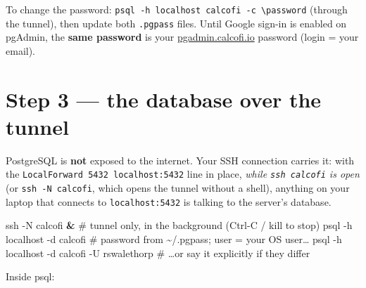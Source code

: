 \documentclass[
  letterpaper,
  DIV=11,
  numbers=noendperiod]{scrreprt}
\newenvironment{Shaded}{\begin{snugshade}}{\end{snugshade}}
\newcommand{\AttributeTok}[1]{\textcolor[rgb]{0.40,0.45,0.13}{#1}}
\newcommand{\CommentTok}[1]{\textcolor[rgb]{0.37,0.37,0.37}{#1}}
\newcommand{\DecValTok}[1]{\textcolor[rgb]{0.68,0.00,0.00}{#1}}
\newcommand{\ExtensionTok}[1]{\textcolor[rgb]{0.00,0.23,0.31}{#1}}
\newcommand{\FunctionTok}[1]{\textcolor[rgb]{0.28,0.35,0.67}{#1}}
\newcommand{\KeywordTok}[1]{\textcolor[rgb]{0.00,0.23,0.31}{\textbf{#1}}}
\newcommand{\NormalTok}[1]{\textcolor[rgb]{0.00,0.23,0.31}{#1}}
\newcommand{\OperatorTok}[1]{\textcolor[rgb]{0.37,0.37,0.37}{#1}}
\begin{document}
To change the password:
\texttt{psql\ -h\ localhost\ calcofi\ -c\ \textquotesingle{}\textbackslash{}password\textquotesingle{}}
(through the tunnel), then update both \texttt{.pgpass} files. Until
Google sign-in is enabled on pgAdmin, the \textbf{same password} is your
\href{https://pgadmin.calcofi.io}{pgadmin.calcofi.io} password (login =
your email).

\section{Step 3 --- the database over the tunnel}\label{sec-tunnel}

PostgreSQL is \textbf{not} exposed to the internet. Your SSH connection
carries it: with the \texttt{LocalForward\ 5432\ localhost:5432} line in
place, \emph{while \texttt{ssh\ calcofi} is open} (or
\texttt{ssh\ -N\ calcofi}, which opens the tunnel without a shell),
anything on your laptop that connects to \texttt{localhost:5432} is
talking to the server's database.

\begin{Shaded}
\begin{Highlighting}[]
\FunctionTok{ssh} \AttributeTok{{-}N}\NormalTok{ calcofi }\KeywordTok{\&}                                  \CommentTok{\# tunnel only, in the background (Ctrl{-}C / kill to stop)}
\ExtensionTok{psql} \AttributeTok{{-}h}\NormalTok{ localhost }\AttributeTok{{-}d}\NormalTok{ calcofi                       }\CommentTok{\# password from \textasciitilde{}/.pgpass; user = your OS user…}
\ExtensionTok{psql} \AttributeTok{{-}h}\NormalTok{ localhost }\AttributeTok{{-}d}\NormalTok{ calcofi }\AttributeTok{{-}U}\NormalTok{ rswalethorp        }\CommentTok{\# …or say it explicitly if they differ}
\end{Highlighting}
\end{Shaded}

Inside psql:

\begin{Shaded}
\end{Shaded}
\end{document}
